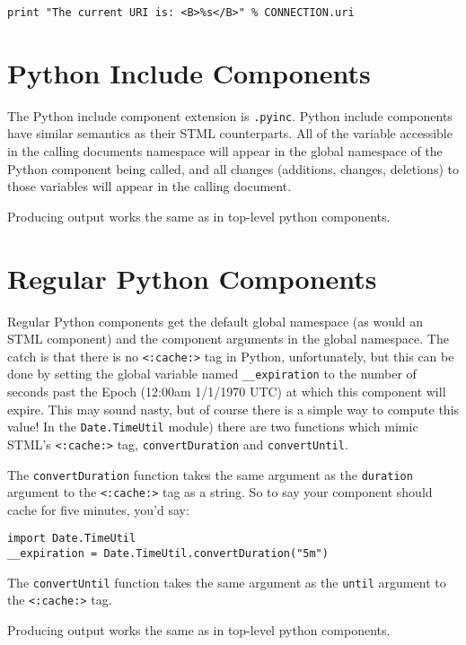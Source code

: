 \documentclass{manual}
\begin{document}
{{\begin{verbatim}
print "The current URI is: <B>%s</B>" % CONNECTION.uri
\end{verbatim}




\section{Python Include Components}
\label{pythonincl}
The Python include component extension is \texttt{.pyinc}.
Python include components have similar semantics as their STML
counterparts.  All of the variable accessible in the calling documents
namespace will appear in the global namespace of the Python component
being called, and all changes (additions, changes, deletions) to those
variables will appear in the calling document.  

Producing output works the same as in top-level python components.




\section{Regular Python Components}
\label{pythonreg}
Regular Python components get the default global namespace (as would
an STML component) and the component arguments in the global
namespace.  The catch is that there is no \texttt{<:cache:>} tag
in Python,  unfortunately, but this can be done by setting the global variable
named \texttt{__expiration} to the number of seconds past the Epoch
(12:00am 1/1/1970 UTC) at which this component will expire.  This may sound
nasty, but of course there is a simple way to compute this value!  In
the \texttt{Date.TimeUtil} module) there are two functions which mimic STML's
\texttt{<:cache:>} tag, \texttt{convertDuration} and
\texttt{convertUntil}. 

The \texttt{convertDuration} function takes the same argument as the
\texttt{duration} argument to the \texttt{<:cache:>} tag as a string.  So
to say your component should cache for five minutes, you'd say:

\begin{verbatim}
import Date.TimeUtil
__expiration = Date.TimeUtil.convertDuration("5m")
\end{verbatim}


The \texttt{convertUntil} function takes the same argument as the
\texttt{until} argument to the \texttt{<:cache:>} tag.

Producing output works the same as in top-level python components.



}}
\end{document}
